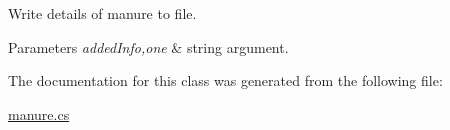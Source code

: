 Write details of manure to file. 


\begin{DoxyParams}{Parameters}
{\em added\+Info,one} & string argument. \\
\hline
\end{DoxyParams}


The documentation for this class was generated from the following file\+:\begin{DoxyCompactItemize}
\item 
\mbox{\hyperlink{manure_8cs}{manure.\+cs}}\end{DoxyCompactItemize}

